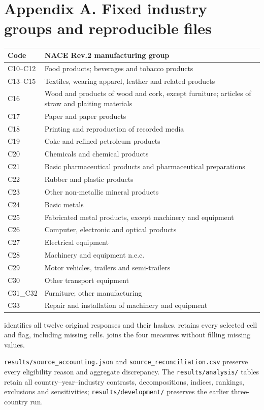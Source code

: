 \documentclass[11pt,letterpaper]{article}
\begin{document}
\section*{Appendix A. Fixed industry groups and reproducible files}
\begin{center}\small
\begin{tabular}{lp{5.6in}}\toprule
Code & NACE Rev.2 manufacturing group\\\midrule
C10--C12 & Food products; beverages and tobacco products\\
C13--C15 & Textiles, wearing apparel, leather and related products\\
C16 & Wood and products of wood and cork, except furniture; articles of straw and plaiting materials\\
C17 & Paper and paper products\\
C18 & Printing and reproduction of recorded media\\
C19 & Coke and refined petroleum products\\
C20 & Chemicals and chemical products\\
C21 & Basic pharmaceutical products and pharmaceutical preparations\\
C22 & Rubber and plastic products\\
C23 & Other non-metallic mineral products\\
C24 & Basic metals\\
C25 & Fabricated metal products, except machinery and equipment\\
C26 & Computer, electronic and optical products\\
C27 & Electrical equipment\\
C28 & Machinery and equipment n.e.c.\\
C29 & Motor vehicles, trailers and semi-trailers\\
C30 & Other transport equipment\\
C31\_C32 & Furniture; other manufacturing\\
C33 & Repair and installation of machinery and equipment\\\bottomrule
\end{tabular}
\end{center}
 identifies all twelve original responses and their hashes.  retains every selected cell and flag, including missing cells.  joins the four measures without filling missing values.

\texttt{results/source\_accounting.json} and \texttt{source\_reconciliation.csv} preserve every eligibility reason and aggregate discrepancy. The \texttt{results/analysis/} tables retain all country--year--industry contrasts, decompositions, indices, rankings, exclusions and sensitivities; \texttt{results/development/} preserves the earlier three-country run.
\end{document}
